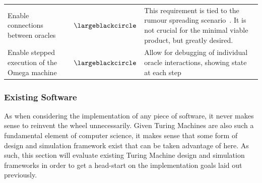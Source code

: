 \documentclass[12pt]{article}
\begin{document}
\begin{table}[h!]
\begin{tabular}{m{3in} m{0.5in} m{2.5in}}
					Enable connections between oracles & \begin{center}\textcolor{Dandelion}{$\largeblackcircle$}\end{center} & This requirement is tied to the rumour spreading scenario~\cite{Zhang2014}. It is not crucial for the minimal viable product, but greatly desired.  \\
					Enable stepped execution of the Omega machine& \begin{center}\textcolor{YellowGreen}{$\largeblackcircle$}\end{center} & Allow for debugging of individual oracle interactions, showing state at each step
				\end{tabular}
			\end{table}
		
		\clearpage\subsubsection{Existing Software}	
			As when considering the implementation of any piece of software, it never makes sense to reinvent the wheel unnecessarily.
			Given Turing Machines are also such a fundamental element of computer science, it makes sense that some form of design and simulation framework exist that can be taken advantage of here.
			As such, this section will evaluate existing Turing Machine design and simulation frameworks in order to get a head-start on the implementation goals laid out previously.
\end{document}
